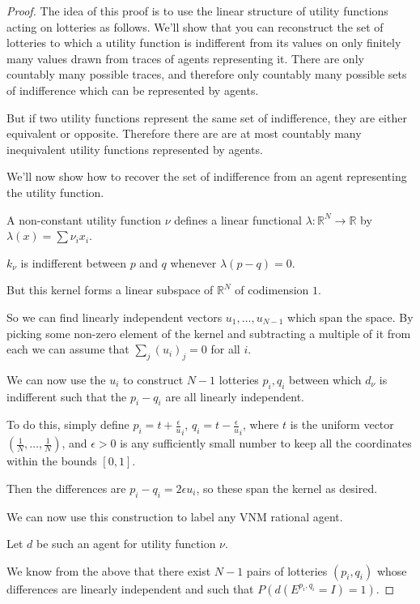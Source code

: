 \documentclass[a4paper]{book}
\begin{document}
\begin{proof}
The idea of this proof is to use the linear structure of utility functions
acting on lotteries as follows. We'll show that you can reconstruct the
set of lotteries to which a utility function is indifferent from its
values on only finitely many values drawn from traces of agents representing
it. There are only countably many possible traces, and therefore only
countably many possible sets of indifference which can be
represented by agents.

But if two utility functions represent the same set of indifference, they
are either equivalent or opposite. Therefore there are are at most
countably many inequivalent utility functions represented by agents.

We'll now show how to recover the set of indifference from an agent
representing the utility function.

A non-constant utility function $\nu$ defines a linear functional
$\lambda: \mathbb{R}^N \to \mathbb{R}$ by $\lambda(x) = \sum \nu_i x_i$.

$k_\nu$ is indifferent between $p$ and $q$ whenever $\lambda(p - q) = 0$.

But this kernel forms a linear subspace of $\mathbb{R}^N$ of codimension $1$.

So we can find linearly independent vectors $u_1, \ldots, u_{N-1}$ which span
the space. By picking some non-zero element of the kernel and subtracting a
multiple of it from each we can assume that $\sum\limits_j (u_i)_j = 0$ for
all $i$.

We can now use the $u_i$ to construct $N - 1$ lotteries $p_i, q_i$ between
which $d_\nu$ is indifferent such that the $p_i - q_i$ are all linearly
independent.

To do this, simply define $p_i = t + \frac{\epsilon} u_i$,
$q_i = t - \frac{\epsilon} u_i$, where $t$ is the uniform vector
$(\frac{1}{N}, \ldots, \frac{1}{N})$, and $\epsilon > 0$ is any
sufficiently small number to keep all the coordinates within the bounds
$[0, 1]$.

Then the differences are $p_i - q_i = 2\epsilon u_i$, so these span the
kernel as desired.

We can now use this construction to label any VNM rational agent.

Let $d$ be such an agent for utility function $\nu$.

We know from the above that there exist $N - 1$ pairs of lotteries $(p_i, q_i)$
whose differences are linearly independent and such that
$P(d(E^{p_i, q_i} = I) = 1)$.


\end{proof}
\end{document}
